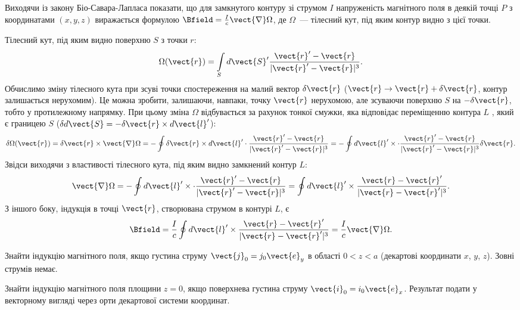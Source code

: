 \begin{problem}
Виходячи із закону Біо-Савара-Лапласа показати, що для замкнутого контуру зі струмом $I$ напруженість магнітного поля в деякій точці $P$ з координатами $(x,y,z)$ виражається формулою $\Bfield = \frac{I}{c} \vect{\nabla}\Omega$, де $\Omega$~--- тілесний кут, під яким контур видно з цієї точки.
\begin{solution}
    Тілесний кут, під яким видно поверхню $S$ з точки $r$:
    \[
        \Omega(\vect{r}) = \int\limits_S d\vect{S}'\frac{\vect{r}' - \vect{r}}{|\vect{r}' - \vect{r}|^3}.
    \]
    Обчислимо зміну тілесного кута при зсуві точки спостереження на малий вектор $\delta\vect{r}$   ($\vect{r} \to \vect{r} + \delta\vect{r}$, контур залишається нерухомим). Це можна зробити, залишаючи, навпаки, точку $\vect{r}$  нерухомою, але зсуваючи поверхню $S$  на $-\delta\vect{r}$, тобто у протилежному напрямку. При цьому зміна $\Omega$ відбувається за рахунок тонкої смужки, яка відповідає переміщенню контура $L$ , який є границею $S$ ($\delta d{\vect{S}} =  - \delta\vect{r} \times d{\vect{l}'}$):
    \[
        \delta\Omega(\vect{r}) = \delta\vect{r}\times \vect{\nabla}\Omega = -\oint \delta\vect{r}\times d\vect{l}' \cdot \frac{\vect{r}' - \vect{r}}{|\vect{r}' - \vect{r}|^3} = - \oint  d\vect{l}' \times \cdot \frac{\vect{r}' - \vect{r}}{|\vect{r}' - \vect{r}|^3} \delta\vect{r}.
    \]
    Звідси виходячи з властивості тілесного кута, під яким видно замкнений контур $L$:
	\[
		\vect{\nabla}\Omega = - \oint  d\vect{l}' \times \cdot \frac{\vect{r}' - \vect{r}}{|\vect{r}' - \vect{r}|^3} = \oint  d\vect{l}' \times  \frac{\vect{r} - \vect{r}'}{|\vect{r} - \vect{r}'|^3}.
	\]
    З іншого боку, індукція в точці $\vect{r}$, створювана струмом в контурі $L$, є
	\[
		\Bfield = \frac{I}{c} \oint  d\vect{l}' \times  \frac{\vect{r} - \vect{r}'}{|\vect{r} - \vect{r}'|^3} = \frac{I}{c} \vect{\nabla}\Omega.
	\]
\end{solution}
\end{problem}


\begin{problem}
Знайти індукцію магнітного поля, якщо густина струму $\vect{j}_0 = j_0\vect{e}_y$   в області  $0 < z < a$ (декартові координати $x$, $y$, $z$). Зовні струмів немає.
\end{problem}

\begin{problem}
Знайти індукцію магнітного поля площини $z=0$, якщо поверхнева густина струму $\vect{i}_0 = i_0\vect{e}_x$. Результат подати у векторному вигляді через орти декартової системи координат.
\end{problem}

